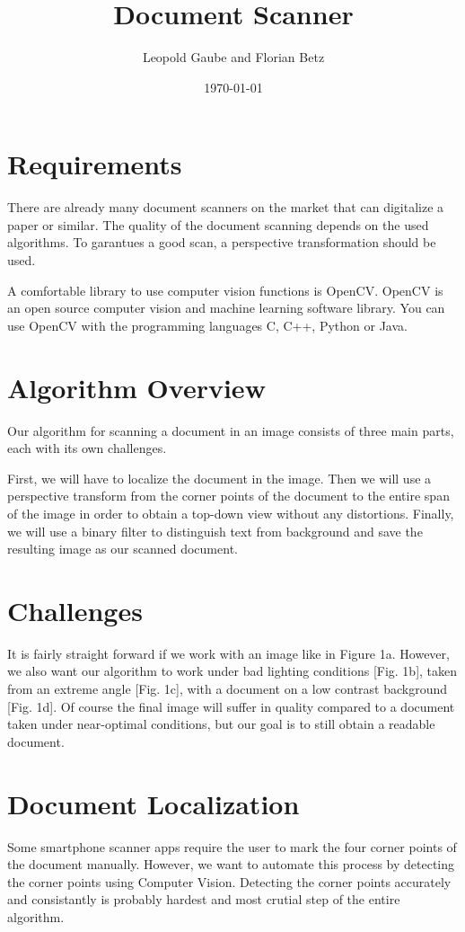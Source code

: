 \documentclass[bibliography=totoc]{scrartcl}
\title{Document Scanner}
\author{Leopold Gaube and Florian Betz}
\date{\today}
\begin{document}
	\maketitle
	\tableofcontents

	\clearpage

	\section{Requirements}

		There are already many document scanners on the market that can digitalize a paper or similar. 
		The quality of the document scanning depends on the used algorithms.
		To garantues a good scan, a perspective transformation should be used.
		
	    A comfortable library to use computer vision functions is \ac{OpenCV}.
	    \ac{OpenCV} is an open source computer vision and machine learning software library. \cite{OpenCV}
	    You can use OpenCV with the programming languages C, C++, Python or Java.
	    
	    

    \section{Algorithm Overview}
	Our algorithm for scanning a document in an image consists of three main parts, each with its own challenges.
	
	First, we will have to localize the document in the image. 
	Then we will use a perspective transform from the corner points of the document to the entire span of the image in order to obtain a top-down view without any distortions.
	Finally, we will use a binary filter to distinguish text from background and save the resulting image as our scanned document.

	\section{Challenges}
	It is fairly straight forward if we work with an image like in Figure 1a.
	However, we also want our algorithm to work under bad lighting conditions [Fig. 1b], taken from an extreme angle [Fig. 1c], with a document on a low contrast background [Fig. 1d].
	Of course the final image will suffer in quality compared to a document taken under near-optimal conditions, but our goal is to still obtain a readable document.
	
	\section{Document Localization}
	Some smartphone scanner apps require the user to mark the four corner points of the document manually. 
	However, we want to automate this process by detecting the corner points using Computer Vision.
	Detecting the corner points accurately and consistantly is probably hardest and most crutial step of the entire algorithm. 
	
\end{document}
